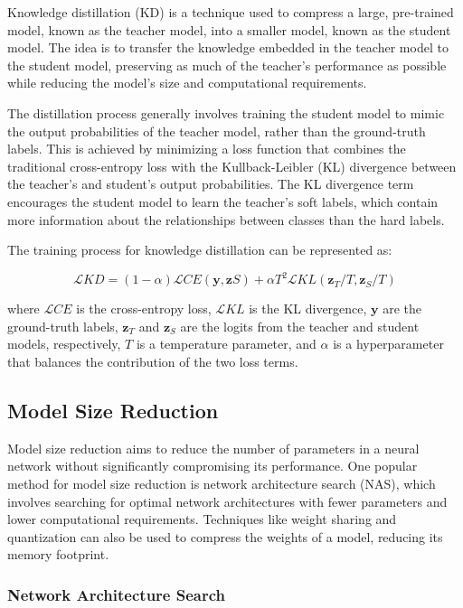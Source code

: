 \documentclass[12pt]{article}
\begin{document}
Knowledge distillation (KD) is a technique used to compress a large, pre-trained model, known as the teacher model, into a smaller model, known as the student model. The idea is to transfer the knowledge embedded in the teacher model to the student model, preserving as much of the teacher's performance as possible while reducing the model's size and computational requirements.

The distillation process generally involves training the student model to mimic the output probabilities of the teacher model, rather than the ground-truth labels. This is achieved by minimizing a loss function that combines the traditional cross-entropy loss with the Kullback-Leibler (KL) divergence between the teacher's and student's output probabilities. The KL divergence term encourages the student model to learn the teacher's soft labels, which contain more information about the relationships between classes than the hard labels.

The training process for knowledge distillation can be represented as:

\begin{equation}
\mathcal{L}{KD} = (1 - \alpha) \mathcal{L}{CE}(\textbf{y}, \textbf{z}S) + \alpha T^2 \mathcal{L}{KL}(\textbf{z}_T/T, \textbf{z}_S/T)
\end{equation}

where $\mathcal{L}{CE}$ is the cross-entropy loss, $\mathcal{L}{KL}$ is the KL divergence, $\textbf{y}$ are the ground-truth labels, $\textbf{z}_T$ and $\textbf{z}_S$ are the logits from the teacher and student models, respectively, $T$ is a temperature parameter, and $\alpha$ is a hyperparameter that balances the contribution of the two loss terms.

\subsection{Model Size Reduction}

Model size reduction aims to reduce the number of parameters in a neural network without significantly compromising its performance. One popular method for model size reduction is network architecture search (NAS), which involves searching for optimal network architectures with fewer parameters and lower computational requirements. Techniques like weight sharing and quantization can also be used to compress the weights of a model, reducing its memory footprint.

\subsubsection{Network Architecture Search}
\end{document}
